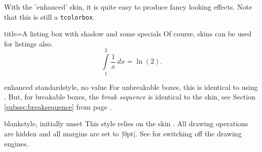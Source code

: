 \begin{dispExample}

\begin{tcolorbox}[title=Nice box in rainbow colors]
  With the 'enhanced' skin, it is quite easy to produce fancy looking effects.
  \tcblower
  Note that this is still a \texttt{tcolorbox}.
\end{tcolorbox}
\end{dispExample}


\begin{dispExample}

\begin{tcblisting}{title=A listing box with shadow and some specials}
Of course, skins can be used for listings also.
\begin{equation}
  \int\limits_1^2 \frac{1}{x}~dx = \ln(2).
\end{equation}
\end{tcblisting}
\end{dispExample}


\clearpage


\begin{docTcbKey}{enhanced standard}{}{style, no value}
  For unbreakable boxes, this is identical to using .
  But, for breakable boxes, the \emph{break sequence} is identical to the  skin,
  see Section \ref{subsec:breaksequence} from page \pageref{subsec:breaksequence}.
\end{docTcbKey}


\begin{docTcbKey}{blank}{}{style, initially unset}
  This style relies on the skin . All drawing operations
  are hidden and all margins are set to |0pt|. See 
  for switching off the drawing engines.
\begin{dispExample}
\begin{tcolorbox}[blank,watermark text=A blank box]
\lipsum[1]
\end{tcolorbox}
\end{dispExample}
\end{docTcbKey}

